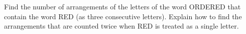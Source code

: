 Find the number of arrangements of the letters of the word ORDERED that contain the word RED (as three consecutive letters). Explain how to find the arrangements that are counted twice when RED is treated as a single letter.

